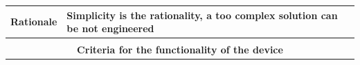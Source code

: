 \documentclass[whitelogo]{tudelft-report}
\begin{document}
{{\begin{table}[]
\begin{tabular}{|l|l|l|l|l|}
\textbf{Rationale}                  & \multicolumn{4}{l|}{Simplicity is the rationality, a too complex solution can be not engineered}                                                                                                                                                                                                                                                                                                                                                                                                                                                                                                                                              \\ \hline
\multicolumn{5}{|l|}{}                                                                                                                                                                                                                                                                                                                                                                                                                                                                                                                                                                                                                                                              \\ \hline
\multicolumn{5}{|c|}{\textbf{Criteria for the functionality of the device}}                                                                                                                                                                                                                                                                                                                                                                                                                                                                                                                                                                                                         \\ \hline

\end{tabular}
\end{table}}}
\end{document}
